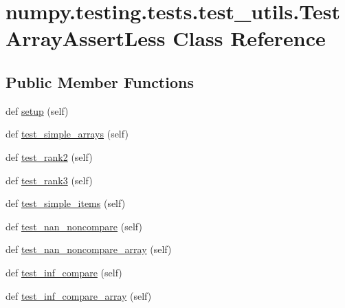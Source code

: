 \hypertarget{classnumpy_1_1testing_1_1tests_1_1test__utils_1_1TestArrayAssertLess}{}\section{numpy.\+testing.\+tests.\+test\+\_\+utils.\+Test\+Array\+Assert\+Less Class Reference}
\label{classnumpy_1_1testing_1_1tests_1_1test__utils_1_1TestArrayAssertLess}
\subsection*{Public Member Functions}
\begin{DoxyCompactItemize}
\item 
def \hyperlink{classnumpy_1_1testing_1_1tests_1_1test__utils_1_1TestArrayAssertLess_a9c8a3d89db4167c1213dedd9837b5365}{setup} (self)
\item 
def \hyperlink{classnumpy_1_1testing_1_1tests_1_1test__utils_1_1TestArrayAssertLess_a37587d996d647cbef175e69e15085495}{test\+\_\+simple\+\_\+arrays} (self)
\item 
def \hyperlink{classnumpy_1_1testing_1_1tests_1_1test__utils_1_1TestArrayAssertLess_a5578512784aeab756a3d12f7a75aa948}{test\+\_\+rank2} (self)
\item 
def \hyperlink{classnumpy_1_1testing_1_1tests_1_1test__utils_1_1TestArrayAssertLess_a75d5c850f3ba63fbbf489425daa45a22}{test\+\_\+rank3} (self)
\item 
def \hyperlink{classnumpy_1_1testing_1_1tests_1_1test__utils_1_1TestArrayAssertLess_a6c7a3451b0ad0a471dab0c0297573c82}{test\+\_\+simple\+\_\+items} (self)
\item 
def \hyperlink{classnumpy_1_1testing_1_1tests_1_1test__utils_1_1TestArrayAssertLess_a6ee3e09e4a6b12342f5ef8f209ddae84}{test\+\_\+nan\+\_\+noncompare} (self)
\item 
def \hyperlink{classnumpy_1_1testing_1_1tests_1_1test__utils_1_1TestArrayAssertLess_af45c29f1e6c344f0f00b502a7d393d56}{test\+\_\+nan\+\_\+noncompare\+\_\+array} (self)
\item 
def \hyperlink{classnumpy_1_1testing_1_1tests_1_1test__utils_1_1TestArrayAssertLess_ae47e5663aa248bde42f564633049c49c}{test\+\_\+inf\+\_\+compare} (self)
\item 
def \hyperlink{classnumpy_1_1testing_1_1tests_1_1test__utils_1_1TestArrayAssertLess_a47cd23305e0e251a1aa6d7478a344fb4}{test\+\_\+inf\+\_\+compare\+\_\+array} (self)
\end{DoxyCompactItemize}



